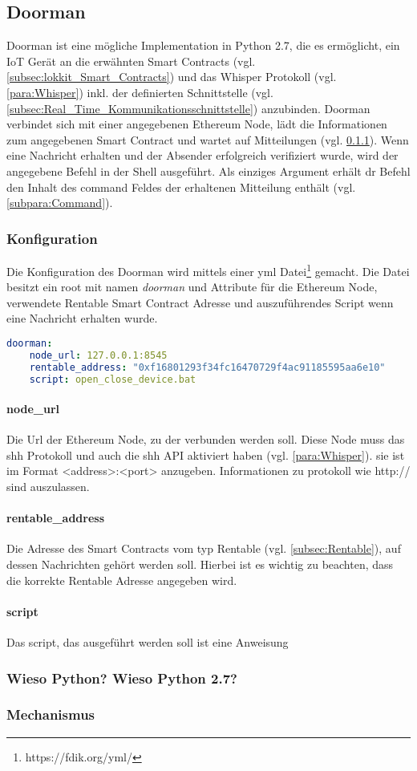 \subsection{Doorman}
\label{subsec:Doorman}
Doorman ist eine mögliche Implementation in Python 2.7, die es ermöglicht, ein IoT Gerät an die erwähnten Smart Contracts (vgl. \ref{subsec:lokkit_Smart_Contracts}) und das Whisper Protokoll (vgl. \ref{para:Whisper}) inkl. der definierten Schnittstelle (vgl. \ref{subsec:Real_Time_Kommunikationsschnittstelle}) anzubinden.
Doorman verbindet sich mit einer angegebenen Ethereum Node, lädt die Informationen zum angegebenen Smart Contract und wartet auf Mitteilungen (vgl. \ref{subsec:Konfiguration}). Wenn eine Nachricht erhalten und der Absender erfolgreich verifiziert wurde, wird der angegebene Befehl in der Shell ausgeführt. Als einziges Argument erhält dr Befehl den Inhalt des command Feldes der erhaltenen Mitteilung enthält (vgl. \ref{subpara:Command}).
\subsubsection{Konfiguration}
\label{subsec:Konfiguration}
Die Konfiguration des Doorman wird mittels einer yml Datei\footnote{https://fdik.org/yml/} gemacht. Die Datei besitzt ein root mit namen \emph{doorman} und Attribute für die Ethereum Node, verwendete Rentable Smart Contract Adresse und auszuführendes Script wenn eine Nachricht erhalten wurde.
\begin{lstlisting}[language=yml,caption={Beispielkonfiguration für Doorman}]
doorman:
    node_url: 127.0.0.1:8545
    rentable_address: "0xf16801293f34fc16470729f4ac91185595aa6e10"
    script: open_close_device.bat
\end{lstlisting}

\paragraph{node_url}
Die Url der Ethereum Node, zu der verbunden werden soll. Diese Node muss das shh Protokoll und auch die shh API aktiviert haben (vgl. \ref{para:Whisper}). sie ist im Format <address>:<port> anzugeben. Informationen zu protokoll wie http:// sind auszulassen.
\paragraph{rentable_address}
Die Adresse des Smart Contracts vom typ Rentable (vgl. \ref{subsec:Rentable}), auf dessen Nachrichten gehört werden soll. Hierbei ist es wichtig zu beachten, dass die korrekte Rentable Adresse angegeben wird.
\paragraph{script}
Das script, das ausgeführt werden soll ist eine Anweisung 


\subsubsection{Wieso Python? Wieso Python 2.7?}
\subsubsection{Mechanismus}




